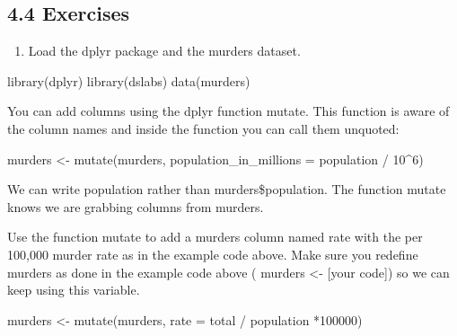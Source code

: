 \documentclass[
]{article}
\newenvironment{Shaded}{\begin{snugshade}}{\end{snugshade}}
\newcommand{\AttributeTok}[1]{\textcolor[rgb]{0.77,0.63,0.00}{#1}}
\newcommand{\DecValTok}[1]{\textcolor[rgb]{0.00,0.00,0.81}{#1}}
\newcommand{\FunctionTok}[1]{\textcolor[rgb]{0.00,0.00,0.00}{#1}}
\newcommand{\NormalTok}[1]{#1}
\newcommand{\OtherTok}[1]{\textcolor[rgb]{0.56,0.35,0.01}{#1}}
\newcommand{\SpecialCharTok}[1]{\textcolor[rgb]{0.00,0.00,0.00}{#1}}
\providecommand{\tightlist}{%
  \setlength{\itemsep}{0pt}\setlength{\parskip}{0pt}}
\begin{document}
\hypertarget{exercises}{%
\subsection{4.4 Exercises}\label{exercises}}

\begin{enumerate}
\def\labelenumi{\arabic{enumi}.}
\tightlist
\item
  Load the dplyr package and the murders dataset.
\end{enumerate}

\begin{Shaded}
\begin{Highlighting}[]
\FunctionTok{library}\NormalTok{(dplyr)}
\FunctionTok{library}\NormalTok{(dslabs)}
\FunctionTok{data}\NormalTok{(murders)}
\end{Highlighting}
\end{Shaded}

You can add columns using the dplyr function mutate. This function is
aware of the column names and inside the function you can call them
unquoted:

\begin{Shaded}
\begin{Highlighting}[]
\NormalTok{murders }\OtherTok{\textless{}{-}} \FunctionTok{mutate}\NormalTok{(murders, }\AttributeTok{population\_in\_millions =}\NormalTok{ population }\SpecialCharTok{/} \DecValTok{10}\SpecialCharTok{\^{}}\DecValTok{6}\NormalTok{)}
\end{Highlighting}
\end{Shaded}

We can write population rather than murders\$population. The function
mutate knows we are grabbing columns from murders.

Use the function mutate to add a murders column named rate with the per
100,000 murder rate as in the example code above. Make sure you redefine
murders as done in the example code above ( murders \textless- {[}your
code{]}) so we can keep using this variable.

\begin{Shaded}
\begin{Highlighting}[]
\NormalTok{murders }\OtherTok{\textless{}{-}} \FunctionTok{mutate}\NormalTok{(murders, }\AttributeTok{rate =}\NormalTok{ total }\SpecialCharTok{/}\NormalTok{ population }\SpecialCharTok{*}\DecValTok{100000}\NormalTok{)}
\end{Highlighting}
\end{Shaded}
\end{document}

